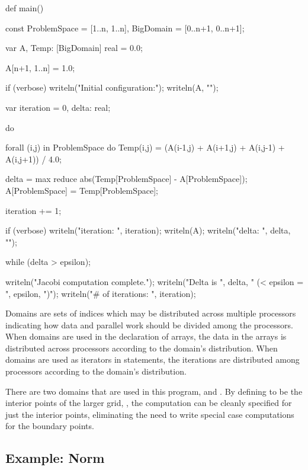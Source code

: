 \begin{numberedchapel}
def main() {
  const ProblemSpace = [1..n, 1..n],
        BigDomain = [0..n+1, 0..n+1];

  var A, Temp: [BigDomain] real = 0.0;

  A[n+1, 1..n] = 1.0;

  if (verbose) {
    writeln("Initial configuration:");
    writeln(A, "\n");
  }

  var iteration = 0,
      delta: real;

  do {
    forall (i,j) in ProblemSpace do
      Temp(i,j) = (A(i-1,j) + A(i+1,j) + A(i,j-1) + A(i,j+1)) / 4.0;

    delta = max reduce abs(Temp[ProblemSpace] - A[ProblemSpace]);
    A[ProblemSpace] = Temp[ProblemSpace];

    iteration += 1;

    if (verbose) {
      writeln("iteration: ", iteration);
      writeln(A);
      writeln("delta: ", delta, "\n");
    }
  } while (delta > epsilon);

  writeln("Jacobi computation complete.");
  writeln("Delta is ", delta, " (< epsilon = ", epsilon, ")");
  writeln("# of iterations: ", iteration);
}
\end{numberedchapel}

Domains are sets of indices which may be distributed
across multiple processors indicating how data and parallel work should
be divided among the processors.  When domains are used in the declaration
of arrays, the data in the arrays is distributed across processors according
to the domain's distribution.  When domains are used as iterators in 
 statements, the iterations are distributed among processors
according to the domain's distribution.

There are two domains that are used in this program, 
and .  By defining  to be the interior
points of the larger grid, , the computation can be cleanly specified
for just the interior points, eliminating the need to write special case computations 
for the boundary points.
\subsection{Example: Norm}

